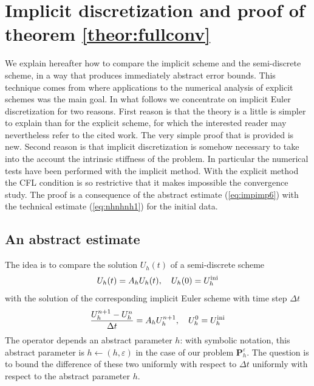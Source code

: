 \documentclass[a4paper,french,english,10pt]{article}
\newcommand\eps{\varepsilon}
\begin{document}
\section{Implicit discretization  and proof of theorem \ref{theor:fullconv}} \label{end:theor}


We explain hereafter how to compare the implicit scheme and the semi-discrete scheme, in  a way
that produces immediately abstract error bounds. This technique comes from
\cite{de04} where applications to the numerical analysis of 
 explicit schemes was the main goal. In what follows we concentrate on
implicit Euler discretization for two reasons. First reason is that the theory is a little  is simpler to explain than for
the explicit scheme, 
for which the interested reader may nevertheless refer to the cited work. The  very simple proof that is provided 
is 
new. Second reason is that
implicit discretization  is somehow necessary  to take into the account the intrinsic stiffness of the problem.
In particular the numerical tests have been performed with the implicit method. With the explicit method 
the CFL condition is so restrictive that it makes impossible the convergence study.
The proof is a consequence of the abstract estimate (\ref{eq:impimp6}) with the technical estimate
(\ref{eq:nhnhnh1})
for the initial data.

\subsection{An abstract estimate}

The idea is to compare the solution $U_{h}(t)$ of a semi-discrete scheme 
 \begin{equation} \label{eq:impimp1}
 U_{h}(t)=A_h U_{h}(t), \quad U_{h}(0)=U_h^{\rm ini}
 \end{equation}
 with the solution of the corresponding  implicit Euler scheme
 with   time step  $\Delta t$
  \begin{equation} \label{eq:impimp2}
\frac{  U_{h}^{n+1} -U_{h}^n}{\Delta t}=A_h U_{h}^{n+1}, \quad U_{h}^0=U_h^{\rm ini}
 \end{equation}
 The operator depends an abstract  parameter $h$:  with symbolic notation, this abstract 
 parameter is  $h\leftarrow (h,\eps)$
 in the case
 of  %
 our problem $\mathbf P_h^\eps$. The question is to bound the difference of these
 two uniformly with respect to $\Delta t$ uniformly with respect to the abstract parameter $h$.
\end{document}
